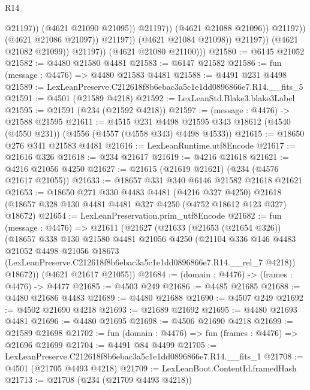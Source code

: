 \begin{lexlean}{R14}
\begin{coremodule}
                                          @21197))
                                      (@4621 @21090 @21095))
                                    @21197))
                                (@4621 @21088 @21096))
                              @21197))
                          (@4621 @21086 @21097))
                        @21197))
                    (@4621 @21084 @21098))
                  @21197))
              (@4621 @21082 @21099))
            @21197))
        (@4621 @21080 @21100)))
@21580 := @6145 @21052
@21582 := @4480 @21580 @4481
@21583 := @6147 @21582
@21586 := fun (message : @4476) => @4480 @21583 @4481
@21588 := @4491 @231 @4498
@21589 := LexLeanPreserve.C212618f8b6ebac3a5c1e1dd0896866e7.R14.__fits_5
@21591 := @4501 (@21589 @4218)
@21592 := LexLeanStd.Blake3.blake3Label
@21595 := @21591 (@234 (@21592 @4218))
@21597 := (message : @4476) -> @21588 @21595
@21611 := @4515
    @231
    @4498
    @21595
    @343
    @18612
    (@4540 (@4550 @231))
    (@4556 (@4557 (@4558 @343) @4498 @4533))
@21615 := @18650 @276 @341 @21583 @4481
@21616 := LexLeanRuntime.utf8Encode
@21617 := @21616 @326
@21618 := @234 @21617
@21619 := @4216 @21618
@21621 := @4216 @21056 @4250
@21627 := @21615 (@21619 @21621) (@234 (@4576 @21617 @21055))
@21633 := @18657 @331 @340 @6146 @21582 @21618 @21621
@21653 := @18650
    @271
    @330
    @4483
    @4481
    (@4216 @327 @4250)
    @21618
    (@18657 @328 @130 @4481 @4481 @327 @4250 (@4752 @18612 @123 @327) @18672)
@21654 := LexLeanPreservation.prim_utf8Encode
@21682 := fun (message : @4476) =>
  @21611
    (@21627
      (@21633
        (@21653 (@21654 @326))
        (@18657
          @338
          @130
          @21580
          @4481
          @21056
          @4250
          (@21104
            @336
            @146
            @4483
            @21052
            @4498
            @21056
            @18673
            (LexLeanPreserve.C212618f8b6ebac3a5c1e1dd0896866e7.R14.__rel_7 @4218))
          @18672))
      (@4621 @21617 @21055))
@21684 := (domain : @4476) -> (frames : @4476) -> @4477
@21685 := @4503 @249
@21686 := @4485 @21685
@21688 := @4480 @21686 @4483
@21689 := @4480 @21688
@21690 := @4507 @249
@21692 := @4502 @21690 @4218
@21693 := @21689 @21692
@21695 := @4480 @21693 @4481
@21696 := @4480 @21695
@21698 := @4506 @21690 @4218
@21699 := @21589 @21698
@21702 := fun (domain : @4476) => fun (frames : @4476) => @21696 @21699
@21704 := @4491 @84 @4499
@21705 := LexLeanPreserve.C212618f8b6ebac3a5c1e1dd0896866e7.R14.__fits_1
@21708 := @4501 (@21705 @4493 @4218)
@21709 := LexLeanBoot.ContentId.framedHash
@21713 := @21708 (@234 (@21709 @4493 @4218))

\end{coremodule}
\end{lexlean}
